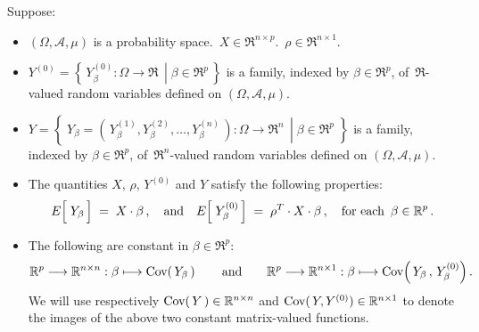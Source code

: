 \vskip 1.0cm

\begin{theorem}
\label{formulaBLUP}
\mbox{}
\vskip 0.1cm
\noindent
Suppose:
\begin{itemize}
\item
	$(\Omega,\mathcal{A},\mu)$ is a probability space.
	\,$X \in \Re^{n \times p}$.\,
	$\rho \in \Re^{n \times 1}$.
\item
	$Y^{(0)} = \left\{\,\left.Y^{(0)}_{\beta} : \Omega \longrightarrow \Re\,\;\right\vert\;\beta\in\Re^{p}\,\right\}$
	is a family, indexed by $\beta \in \Re^{p}$, of \,$\Re$-valued random variables
	defined on $(\Omega,\mathcal{A},\mu)$.
\item
	$Y = \left\{\;Y_{\beta} = \left.(\,Y^{(1)}_{\beta}, Y^{(2)}_{\beta}, \ldots, Y^{(n)}_{\beta}\,)
	: \Omega \longrightarrow \Re^{n}\,\;\right\vert\; \beta \in \Re^{p} \;\right\}$
	is a family, indexed by $\beta \in \Re^{p}$, of \,$\Re^{n}$-valued random variables
	defined on $(\Omega,\mathcal{A},\mu)$.
\item
	The quantities $X$, $\rho$, $Y^{(0)}$ and $Y$ satisfy the following properties:
	\begin{equation*}
	E\!\left[\;\overset{{\color{white}.}}{Y_{\beta}}\,\right] \; = \; X \cdot \beta\,,
	\quad\textnormal{and}\quad
	E\!\left[\;Y^{(0)}_{\beta}\,\right] \; = \; \rho^{T} \cdot X \cdot \beta\,,
	\quad
	\textnormal{for each \,$\beta \in \Re^{p}$}\,.
	\end{equation*}
\item
	The following are constant in $\beta \in \Re^{p}$:
	\begin{equation*}
	\mathbb{R}^{p} \longrightarrow \mathbb{R}^{n \times n} : \beta \longmapsto \textnormal{Cov}\!\left(\,Y_{\beta}\,\right)
	\quad\quad\textnormal{and}\quad\quad
	\mathbb{R}^{p} \longrightarrow \mathbb{R}^{n \times 1} : \beta \longmapsto \textnormal{Cov}\!\left(\,Y_{\beta}\,,\,Y^{(0)}_{\beta}\right).
	\end{equation*}
	We will use respectively $\textnormal{Cov}(\,Y\,)\in\mathbb{R}^{n \times n}$ and $\textnormal{Cov}(\,Y,Y^{(0)}) \in \mathbb{R}^{n \times 1}$
	to denote the images of the above two constant matrix-valued functions.
\end{itemize}

\end{theorem}
